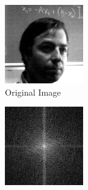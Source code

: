 \documentclass[12pt]{article}
\begin{document}
    \begin{figure}[H]
        \centering
        \begin{subfigure}[t]{0.2\linewidth}
            \centering
            \includegraphics[width=\linewidth]{untransformed.png}
            \caption{Original Image}
        \end{subfigure}
        \begin{subfigure}[t]{0.2\linewidth}
            \centering
            \includegraphics[width=\linewidth]{transformed.png}

\end{subfigure}
\end{figure}
\end{document}
